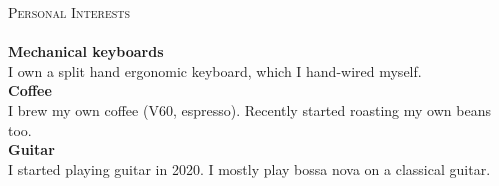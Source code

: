 \documentclass[a4paper]{article}
\newcommand{\lineunder} {
    \vspace*{-8pt} \\
    \hspace*{-18pt} \hrulefill \\
}
\newcommand{\header} [1] {
    {\hspace*{-18pt}\vspace*{6pt} \textsc{#1}}
    \vspace*{-6pt} \lineunder
}
\begin{document}
\header{Personal Interests}
{\textbf{Mechanical keyboards}} \\
I own a split hand ergonomic keyboard, which I hand-wired myself.\\
\vspace*{2mm}
{\textbf{Coffee}} \\
I brew my own coffee (V60, espresso). Recently started roasting my own beans too.\\
\vspace*{2mm}
{\textbf{Guitar}} \\
I started playing guitar in 2020. I mostly play bossa nova on a classical guitar.\\
\vspace*{2mm}

\ 
\end{document}
